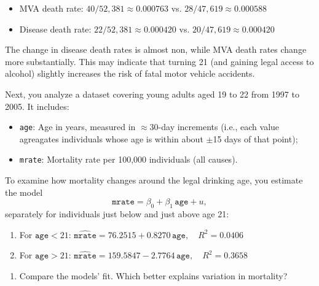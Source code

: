 \documentclass[11pt]{exam}
\begin{document}
\begin{questions}
\begin{solution}[0cm]
\begin{enumerate}[label=(\alph*)]
    \begin{itemize}
        \item MVA death rate: $40/52{,}381 \approx 0.000763$ vs. $28/47{,}619 \approx 0.000588$
        \item Disease death rate: $22/52{,}381 \approx 0.000420$ vs. $20/47{,}619 \approx 0.000420$
    \end{itemize}

    The change in disease death rates is almost non, while MVA death rates change more substantially. This may indicate that turning 21 (and gaining legal access to alcohol) slightly increases the risk of fatal motor vehicle accidents.

\end{enumerate}

\end{solution}

\question[3.5]
Next, you analyze a dataset covering young adults aged 19 to 22 from 1997 to 2005. It includes:

\begin{itemize}
    \item \texttt{age}: Age in years, measured in $\approx$30-day increments (i.e., each value agreagates individuals whose age is within about $\pm$15 days of that point);
    \item \texttt{mrate}: Mortality rate per 100,000 individuals (all causes).
\end{itemize}

To examine how mortality changes around the legal drinking age, you estimate the model
$$
\texttt{mrate} = \beta_0 + \beta_1\,\texttt{age} + u,
$$
separately for individuals just below and just above age 21:

\begin{enumerate}[label=\arabic*.]
    \item For $\texttt{age} < 21$:  
    $\widehat{\texttt{mrate}} = 76.2515 + 0.8270\,\texttt{age},\quad R^2 = 0.0406$
    
    \item For $\texttt{age} > 21$:  
    $\widehat{\texttt{mrate}} = 159.5847 - 2.7764\,\texttt{age},\quad R^2 = 0.3658$
\end{enumerate}

\vspace{0.5em}

\begin{enumerate}[label=(\alph*)]
    \item Compare the models' fit. Which better explains variation in mortality?
    

\end{enumerate}
\end{questions}
\end{document}

